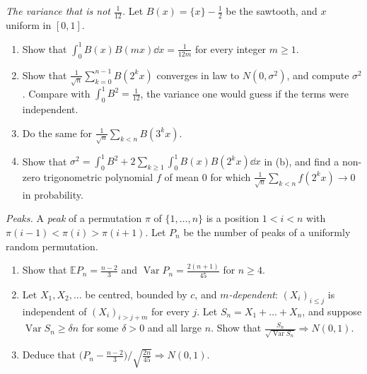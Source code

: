 \begin{exercise}[$\star\star$]\label{pb:sawtooth}
\emph{The variance that is not $\frac1{12}$.} Let $B(x)=\{x\}-\frac12$ be the sawtooth, and $x$ uniform in $[0,1]$.
\begin{enumerate}[label=(\alph*)]
\item Show that $\int_0^1B(x)B(mx)\dd x=\frac1{12m}$ for every integer $m\ge1$.
\item Show that $\frac1{\sqrt n}\sum_{k=0}^{n-1}B(2^kx)$ converges in law to $N(0,\sigma^2)$, and compute $\sigma^2$. Compare with $\int_0^1B^2=\frac1{12}$, the variance one
would guess if the terms were independent.
\item Do the same for $\frac1{\sqrt n}\sum_{k<n}B(3^kx)$.
\item Show that $\sigma^2=\int_0^1B^2+2\sum_{k\ge1}\int_0^1B(x)B(2^kx)\dd x$ in (b), and find a non-zero trigonometric polynomial $f$ of mean $0$ for which
$\frac1{\sqrt n}\sum_{k<n}f(2^kx)\to0$ in probability.
\end{enumerate}
\end{exercise}

\begin{exercise}[$\star\star$]\label{pb:peaks}
\emph{Peaks.} A \emph{peak} of a permutation $\pi$ of $\{1,\dots,n\}$ is a position $1<i<n$ with $\pi(i-1)<\pi(i)>\pi(i+1)$. Let $P_n$ be the number of peaks of a
uniformly random permutation.
\begin{enumerate}[label=(\alph*)]
\item Show that $\mathbb EP_n=\frac{n-2}3$ and $\operatorname{Var}P_n=\frac{2(n+1)}{45}$ for $n\ge4$.
\item Let $X_1,X_2,\dots$ be centred, bounded by $c$, and \emph{$m$-dependent}: $(X_i)_{i\le j}$ is independent of $(X_i)_{i>j+m}$ for every $j$. Let
$S_n=X_1+\dots+X_n$, and suppose $\operatorname{Var}S_n\ge\delta n$ for some $\delta>0$ and all large $n$. Show that $\frac{S_n}{\sqrt{\operatorname{Var}S_n}}\Rightarrow N(0,1)$.
\item Deduce that $\bigl(P_n-\frac{n-2}3\bigr)\big/\sqrt{\frac{2n}{45}}\Rightarrow N(0,1)$.
\end{enumerate}
\end{exercise}

